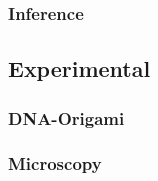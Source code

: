 \subsubsection{Inference}



\subsection{Experimental}
\subsubsection{DNA-Origami}


\subsubsection{Microscopy}


